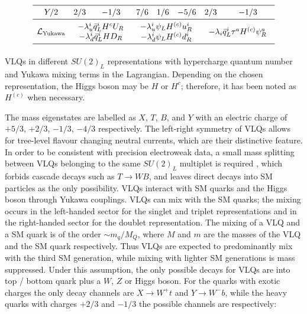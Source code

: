 \begin{table}[htb]
\begin{eqnarray*}
\begin{array}{cccccccc}
\midrule
Y/2  & 2/3 & -1/3 & 7/6 & 1/6 & -5/6 & 2/3 & -1/3 \\
\midrule
\mathcal{L}_{\rm Yukawa} &
\multicolumn{2}{c}{\begin{array}{c}-\lambda_u^i \bar q_L^i H^c U_R \\-\lambda_d^i \bar q_L^i H D_R \end{array}} &
\multicolumn{3}{c}{\begin{array}{c}-\lambda_u^i \psi_L H^{(c)} u_R^i \\-\lambda_d^i \psi_L H^{(c)} d_R^i \end{array}} &
\multicolumn{2}{c}{\begin{array}{c}-\lambda_i \bar q_L^i \tau^a H^{(c)} \psi_R^a \end{array}} \\
\midrule

\end{array} 
\end{eqnarray*}
\captionsetup{width=0.85\textwidth} \caption{\small VLQs in different $SU(2)_L$ representations with hypercharge quantum number and Yukawa mixing terms in the Lagrangian. Depending on the chosen representation, the Higgs boson may be $H$ or $H^c$; therefore, it has been noted as $H^{(c)}$ when necessary.}
\label{sec:theo:vlqs}
\end{table}


The mass eigenstates are labelled as $X$, $T$, $B$, and $Y$ with an electric charge of $+5/3$, $+2/3$, $-1/3$, $-4/3$ respectively.
The left-right symmetry of VLQs allows for tree-level flavour changing neutral currents, which are their distinctive feature.  In order to be consistent with precision electroweak data, a small mass splitting between VLQs belonging to the same $SU(2)_{L}$ multiplet is required \cite{Aguilar-Saavedra:2013qpa}, which forbids cascade decays such as $T \to WB$, and leaves direct decays into SM particles as the only possibility. VLQs interact with SM quarks and the Higgs boson through Yukawa couplings. VLQs can mix with the SM quarks; the mixing occurs in the left-handed sector for the singlet and triplet representations and in the right-handed sector for the doublet representation. The mixing of a VLQ and a SM quark is of the order $\sim m_{q}/M_{Q}$, where $M$ and $m$ are the masses of the VLQ and the SM quark respectively. Thus VLQs are expected to predominantly mix with the third SM generation, while mixing with lighter SM generations is mass suppressed. Under this assumption, the only possible decays for VLQs are into top / bottom quark plus a $W$, $Z$ or Higgs boson. For the quarks with exotic charges the only decay channels are $X \to W^{+}t$ and $Y\to W^{-}b$, while the heavy quarks  with charges $+2/3$ and $-1/3$ the possible channels are respectively:

